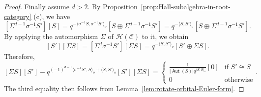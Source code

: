 \documentclass[reqno,12pt,a4paper]{amsart}
\theoremstyle{remark}
\theoremstyle{definition}
\newcommand{\opname}[1]{\operatorname{\mathsf{#1}}}
\newcommand{\Aut}{\opname{Aut}}
\newcommand{\cc}{{\mathcal C}}
\newcommand{\ch}{{\mathcal H}}
\numberwithin{equation}{section}
\begin{document}
\begin{proof}
Finally assume $d>2$. By Proposition~\ref{prop:Hall-subalgebra-in-root-category} (c), we have
\[
[\Sigma^{d-1}\sigma^{-1}S'][S]=q^{-\langle \sigma^{-1}S,\sigma^{-1}S'\rangle_o}[S\oplus\Sigma^{d-1} \sigma^{-1}S']=q^{-\langle S,S'\rangle_o}[S\oplus\Sigma^{d-1} \sigma^{-1}S'].
\]
By applying the automorphism $\Sigma$ of $\ch(\cc)$ to it, we obtain
\[
[S'][\Sigma S]=[\Sigma^{d}\sigma^{-1}S'][\Sigma S]=q^{-\langle S,S'\rangle_o}[S'\oplus\Sigma S].
\]
Therefore,
\[
[\Sigma S][S']-q^{(-1)^{d-1}\langle\sigma^{-1}S',S\rangle_o+\langle S,S'\rangle_o}[S'][\Sigma S]=
\begin{cases} \frac{1}{|\Aut(S)|q^{\langle S,S\rangle_o}}[0] & \text{if }S'\cong S\\
0 &\text{otherwise}
\end{cases}.
\]
The third equality then follows from Lemma~\ref{lem:rotate-orbital-Euler-form}.
\end{proof}
\end{document}

